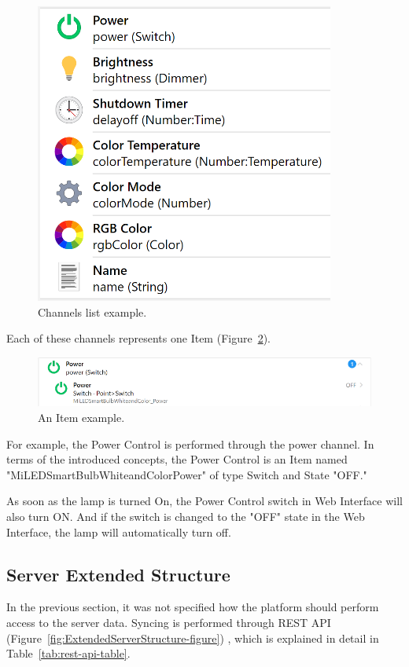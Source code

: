\begin{figure}
  \centering
  \includegraphics[width=0.6\linewidth]{figures/XiaomiLampChannels.png}
  \caption{Channels list example.}
  \label{fig:XiaomiLampChannels-figure}
\end{figure}

Each of these channels represents one Item (Figure~\ref{fig:XiaomiLampPowerItem-figure}).

\begin{figure}
  \centering
  \includegraphics[width=0.9\linewidth]{figures/XiaomiLampPowerItem.png}
  \caption{An Item example.}
  \label{fig:XiaomiLampPowerItem-figure}
\end{figure}

For example, the Power Control is performed through the power channel. In terms of the introduced concepts, the Power Control is an Item named "MiLEDSmartBulbWhiteandColorPower" of type Switch and State "OFF."

As soon as the lamp is turned On, the Power Control switch in Web Interface will also turn ON. And if the switch is changed to the "OFF" state in the Web Interface, the lamp will automatically turn off.

\subsection{Server Extended Structure}

In the previous section, it was not specified how the platform should perform access to the server data. Syncing is performed through REST API (Figure~\ref{fig:ExtendedServerStructure-figure}) , which is explained in detail in Table~\ref{tab:rest-api-table}.

